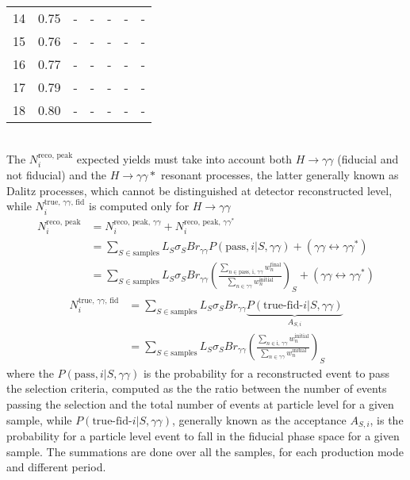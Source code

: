 \begin{table}[h]
\begin{tabular}{l | rrrrrr}
14 &                  0.75 &                    - &              - &                      - &          - &             - \\
15 &                  0.76 &                    - &              - &                      - &          - &             - \\
16 &                  0.77 &                    - &              - &                      - &          - &             - \\
17 &                  0.79 &                    - &              - &                      - &          - &             - \\
18 &                  0.80 &                    - &              - &                      - &          - &             - 
\end{tabular}
\end{table}
\\The $N^\text{reco, peak}_i$ expected yields must take into account both $H \rightarrow \gamma\gamma$ (fiducial and not fiducial) and the $H \rightarrow \gamma\gamma *$ resonant processes, the latter generally known as Dalitz processes, which cannot be distinguished at detector reconstructed level, while $N^\text{true, $\gamma\gamma$, fid}_i$ is computed only for $H \rightarrow \gamma\gamma$
\begin{align}
N^\text{reco, peak}_i &= N^\text{reco, peak, $\gamma\gamma$}_i + N^\text{reco, peak, $\gamma\gamma^*$}_i \\
&= \sum_{S\in\text{samples}} L_S \sigma_S Br_{\gamma\gamma} P(\text{pass}, i|S, \gamma\gamma) + (\gamma\gamma\leftrightarrow\gamma\gamma^*) \\
&= \sum_{S\in\text{samples}} L_S \sigma_S Br_{\gamma\gamma} \left(\frac{ \sum_{n\in\text{pass, i, $\gamma\gamma$}} w^\text{final}_{n} } { \sum_{n\in\gamma\gamma} w^\text{initial}_{n} }\right)_S + (\gamma\gamma\leftrightarrow\gamma\gamma^*)
\end{align}
\begin{align}
N^\text{true, $\gamma\gamma$, fid}_i
&= \sum_{S\in\text{samples}} L_S \sigma_S Br_{\gamma\gamma} \underbrace{P(\text{true-fid-$i$}|S, \gamma\gamma)}_{A_{S, i}}\\
&= \sum_{S\in\text{samples}} L_S \sigma_S Br_{\gamma\gamma} \left(\frac{ \sum_{n\in\text{i, $\gamma\gamma$}} w^\text{initial}_{n} } { \sum_{n\in\gamma\gamma} w^\text{initial}_{n} }\right)_S
\end{align}
where the $P(\text{pass}, i|S, \gamma\gamma)$ is the probability for a reconstructed event to pass the selection criteria, computed as the the ratio between the number of events passing the selection and the total number of events at particle level for a given sample, while $P(\text{true-fid-$i$}|S, \gamma\gamma)$, generally known as the acceptance $A_{S, i}$, is the probability for a particle level event to fall in the fiducial phase space for a given sample. The summations are done over all the samples, for each production mode and different period.

